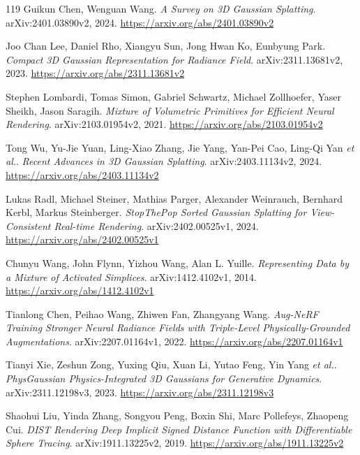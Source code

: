 \documentclass[11pt,a4paper]{article}
\begin{document}
\begin{thebibliography}{119}
Guikun Chen, Wenguan Wang.
\newblock \emph{A Survey on 3D Gaussian Splatting}.
\newblock arXiv:2401.03890v2, 2024.
\newblock \url{https://arxiv.org/abs/2401.03890v2}

Joo Chan Lee, Daniel Rho, Xiangyu Sun, Jong Hwan Ko, Eunbyung Park.
\newblock \emph{Compact 3D Gaussian Representation for Radiance Field}.
\newblock arXiv:2311.13681v2, 2023.
\newblock \url{https://arxiv.org/abs/2311.13681v2}

Stephen Lombardi, Tomas Simon, Gabriel Schwartz, Michael Zollhoefer, Yaser Sheikh, Jason Saragih.
\newblock \emph{Mixture of Volumetric Primitives for Efficient Neural Rendering}.
\newblock arXiv:2103.01954v2, 2021.
\newblock \url{https://arxiv.org/abs/2103.01954v2}

Tong Wu, Yu-Jie Yuan, Ling-Xiao Zhang, Jie Yang, Yan-Pei Cao, Ling-Qi Yan \emph{et al.}.
\newblock \emph{Recent Advances in 3D Gaussian Splatting}.
\newblock arXiv:2403.11134v2, 2024.
\newblock \url{https://arxiv.org/abs/2403.11134v2}

Lukas Radl, Michael Steiner, Mathias Parger, Alexander Weinrauch, Bernhard Kerbl, Markus Steinberger.
\newblock \emph{StopThePop Sorted Gaussian Splatting for View-Consistent Real-time Rendering}.
\newblock arXiv:2402.00525v1, 2024.
\newblock \url{https://arxiv.org/abs/2402.00525v1}

Chunyu Wang, John Flynn, Yizhou Wang, Alan L. Yuille.
\newblock \emph{Representing Data by a Mixture of Activated Simplices}.
\newblock arXiv:1412.4102v1, 2014.
\newblock \url{https://arxiv.org/abs/1412.4102v1}

Tianlong Chen, Peihao Wang, Zhiwen Fan, Zhangyang Wang.
\newblock \emph{Aug-NeRF Training Stronger Neural Radiance Fields with Triple-Level Physically-Grounded Augmentations}.
\newblock arXiv:2207.01164v1, 2022.
\newblock \url{https://arxiv.org/abs/2207.01164v1}

Tianyi Xie, Zeshun Zong, Yuxing Qiu, Xuan Li, Yutao Feng, Yin Yang \emph{et al.}.
\newblock \emph{PhysGaussian Physics-Integrated 3D Gaussians for Generative Dynamics}.
\newblock arXiv:2311.12198v3, 2023.
\newblock \url{https://arxiv.org/abs/2311.12198v3}

Shaohui Liu, Yinda Zhang, Songyou Peng, Boxin Shi, Marc Pollefeys, Zhaopeng Cui.
\newblock \emph{DIST Rendering Deep Implicit Signed Distance Function with Differentiable Sphere Tracing}.
\newblock arXiv:1911.13225v2, 2019.
\newblock \url{https://arxiv.org/abs/1911.13225v2}


\end{thebibliography}
\end{document}
